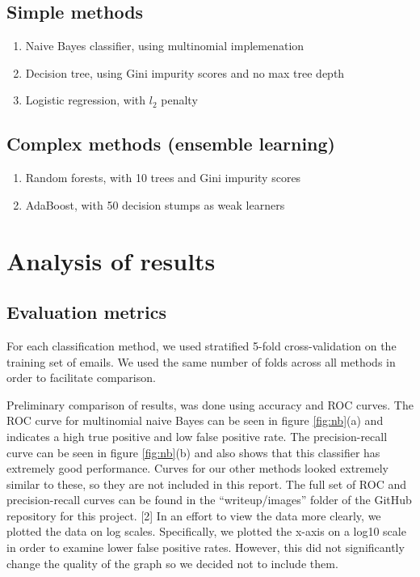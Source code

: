 \documentclass{article} %
\begin{document}
\subsection{Simple methods}
\begin{enumerate}
  \item Naive Bayes classifier, using multinomial implemenation
  \item Decision tree, using Gini impurity scores and no max tree depth
  \item Logistic regression, with $l_2$ penalty
\end{enumerate}

\subsection{Complex methods (ensemble learning)}
\begin{enumerate}
  \item Random forests, with 10 trees and Gini impurity scores 
  \item AdaBoost, with 50 decision stumps as weak learners
\end{enumerate}

\section{Analysis of results}
\subsection{Evaluation metrics}
For each classification method, we used stratified 5-fold cross-validation on the training set of emails. We used the same number of folds across all methods in order to facilitate comparison.

Preliminary comparison of results, was done using accuracy and ROC curves. The ROC curve for multinomial naive Bayes can be seen in figure \ref{fig:nb}(a) and indicates a high true positive and low false positive rate. The precision-recall curve can be seen in figure \ref{fig:nb}(b) and also shows that this classifier has extremely good performance. Curves for our other methods looked extremely similar to these, so they are not included in this report. The full set of ROC and precision-recall curves can be found in the ``writeup/images'' folder of the GitHub repository for this project. [2] In an effort to view the data more clearly, we plotted the data on log scales. Specifically, we plotted the x-axis on a log10 scale in order to examine lower false positive rates. However, this did not significantly change the quality of the graph so we decided not to include them.
\end{document}
